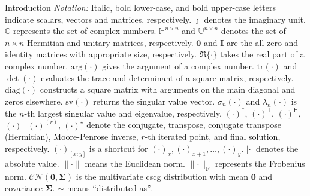 \documentclass[journal]{IEEEtran}
\begin{document}
\begin{section}{Introduction}
	\emph{Notation:}
	Italic, bold lower-case, and bold upper-case letters indicate scalars, vectors and matrices, respectively.
	$\jmath$ denotes the imaginary unit.
	$\mathbb{C}$ represents the set of complex numbers.
	$\mathbb{H}^{n \times n}$ and $\mathbb{U}^{n \times n}$ denotes the set of $n \times n$ Hermitian and unitary matrices, respectively.
	$\mathbf{0}$ and $\mathbf{I}$ are the all-zero and identity matrices with appropriate size, respectively.
	$\Re\{\cdot\}$ takes the real part of a complex number.
	$\mathrm{arg}(\cdot)$ gives the argument of a complex number.
	$\mathrm{tr}(\cdot)$ and $\det(\cdot)$ evaluates the trace and determinant of a square matrix, respectively.
	$\mathrm{diag}(\cdot)$ constructs a square matrix with arguments on the main diagonal and zeros elsewhere.
	$\mathrm{sv}(\cdot)$ returns the singular value vector.
	$\sigma_n(\cdot)$ and $\lambda_n(\cdot)$ is the $n$-th largest singular value and eigenvalue, respectively.
	$(\cdot)^*$, $(\cdot)^\mathsf{T}$, $(\cdot)^\mathsf{H}$, $(\cdot)^\dagger$ $(\cdot)^{(r)}$, $(\cdot)^{\star}$ denote the conjugate, transpose, conjugate transpose (Hermitian), Moore-Penrose inverse, $r$-th iterated point, and final solution, respectively.
	$(\cdot)_{[x:y]}$ is a shortcut for $(\cdot)_x,(\cdot)_{x+1},\ldots,(\cdot)_y$.
	$\lvert \cdot \rvert$ denotes the absolute value.
	$\lVert \cdot \rVert$ means the Euclidean norm.
	$\lVert \cdot \rVert _\mathrm{F}$ represents the Frobenius norm.
	$\mathcal{CN}(\mathbf{0}, \mathbf{\Sigma})$ is the multivariate \gls{cscg} distribution with mean $\mathbf{0}$ and covariance $\mathbf{\Sigma}$.
	$\sim$ means ``distributed as''.
\end{section}
\end{document}
